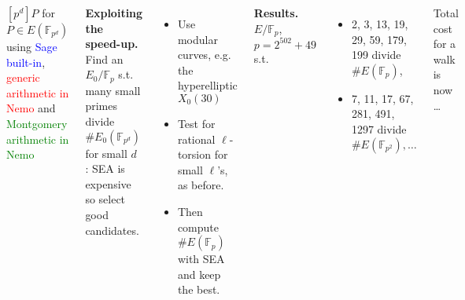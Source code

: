 \documentclass[25pt,a0paper,blockverticalspace=20mm]{tikzposter}
\def\F {\ensuremath{\mathbb{F}}}
\renewcommand{\paragraph}[1]{\smallskip\textbf{#1.}}
\begin{document}
\begin{columns}
{\begin{center}

\small $[p^d] P$ for $P \in E(\F_{p^d})$ using
\textcolor{blue}{Sage built-in},
\textcolor{red}{generic arithmetic in Nemo} and
\textcolor{green}{Montgomery arithmetic in Nemo}

\end{center}

\paragraph{Exploiting the speed-up} Find an $E_0/\F_p$ s.t. many small primes divide $\# E_0(\F_{p^d})$ for small $d$ : SEA is expensive so select good candidates.
\begin{itemize}
\item Use modular curves, e.g. the hyperelliptic $X_0(30)$
\item Test for rational $\ell$-torsion for small $\ell$'s, as before.
\item Then compute $\#E(\F_p)$ with SEA and keep the best.
\end{itemize}

\paragraph{Results} $E/\F_p$, $p = 2^{502} + 49$ s.t.
\begin{itemize}
\item  2, 3, 13, 19, 29, 59, 179, 199 divide $\#E(\F_p)$,
\item 7, 11, 17, 67, 281, 491, 1297 divide $\#E(\F_{p^2}), \ldots$
\end{itemize}
Total cost for a walk is now \ldots

}





\end{columns}
\end{document}

